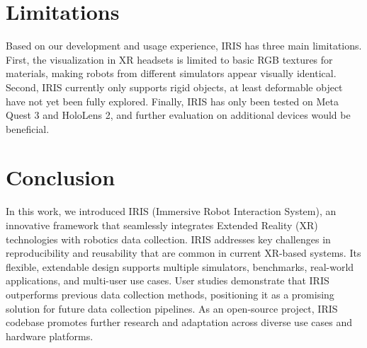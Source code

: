 \section{Limitations}


Based on our development and usage experience, IRIS has three main limitations.
First, the visualization in XR headsets is limited to basic RGB textures for materials, making robots from different simulators appear visually identical.
Second, IRIS currently only supports rigid objects, at least deformable object have not yet been fully explored.
Finally, IRIS has only been tested on Meta Quest 3 and HoloLens 2, and further evaluation on additional devices would be beneficial.

\section{Conclusion}



In this work, we introduced IRIS (Immersive Robot Interaction System), an innovative framework that seamlessly integrates Extended Reality (XR) technologies with robotics data collection. IRIS addresses key challenges in reproducibility and reusability that are common in current XR-based systems. Its flexible, extendable design supports multiple simulators, benchmarks, real-world applications, and multi-user use cases.
User studies demonstrate that IRIS outperforms previous data collection methods, positioning it as a promising solution for future data collection pipelines.
As an open-source project, IRIS codebase promotes further research and adaptation across diverse use cases and hardware platforms.

